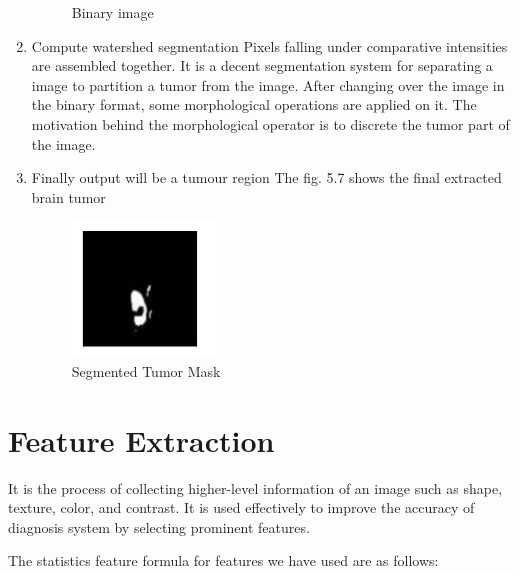 \begin{enumerate}
\begin{figure}[h!]
                \caption{Binary image}
                \label{fig:Binary image}
            \end{figure}
        \item Compute watershed segmentation
            Pixels falling under comparative intensities are assembled together. It is a decent segmentation system for separating a image to partition a tumor from the image. 
            After changing over the image in the binary format, some morphological operations are applied on it. The motivation behind the morphological operator is to discrete the tumor part of the image.
        \item Finally output will be a tumour region
        The fig. 5.7 shows the final extracted brain tumor
            \begin{figure}[h!]
                \centering
                \includegraphics[scale=0.5]{Figures/14.png}
                \caption[Segmented Tumor Mask]{Segmented Tumor Mask}
                \label{fig:Segmented Tumor Mask}
            \end{figure}
   
   \end{enumerate}
 
\section{Feature Extraction}
It is the process of collecting higher-level information of an image such as shape, texture, color, and contrast.  It is used effectively to improve the accuracy of diagnosis system by selecting prominent features.

The statistics feature formula for features we have used are as follows:

